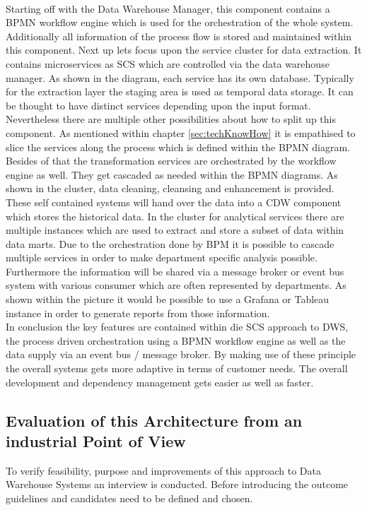 \\
Starting off with the Data Warehouse Manager, this component contains a BPMN workflow engine which is used for the orchestration of the whole system. Additionally all information of the process flow is stored and maintained within this component. \newline
Next up lets focus upon the service cluster for data extraction. It contains microservices as SCS which are controlled via the data warehouse manager. As shown in the diagram, each service has its own database. Typically for the extraction layer the staging area is used as temporal data storage.  It can be thought to have distinct services depending upon the input format. Nevertheless there are multiple other possibilities about how to split up this component. As mentioned within chapter \ref{sec:techKnowHow} it is empathised to slice the services along the process which is defined within the BPMN diagram.\newline
Besides of that the transformation services are orchestrated by the workflow engine as well. They get cascaded as needed within the BPMN diagrams. As shown in the cluster, data cleaning, cleansing and enhancement is provided. These self contained systems will hand over the data into a CDW component which stores the historical data.\newline
In the cluster for analytical services there are multiple instances which are used to extract and store a subset of data within data marts. Due to the orchestration done by BPM it is possible to cascade multiple services in order to make department specific analysis possible. Furthermore the information will be shared via a message broker or event bus system with various consumer which are often represented by departments. As shown within the picture it would be possible to use a Grafana or Tableau instance in order to generate reports from those information.\newline
\\
In conclusion the key features are contained within die SCS approach to DWS, the process driven orchestration using a BPMN workflow engine as well as the data supply via an event bus / message broker. By making use of these principle the overall systems gets more adaptive in terms of customer needs. The overall development and dependency management gets easier as well as faster. 

\subsection{Evaluation of this Architecture from an industrial Point of View}
To verify feasibility, purpose and improvements of this approach to Data Warehouse Systems an interview is conducted. Before introducing the outcome guidelines and candidates need to be defined and chosen.

